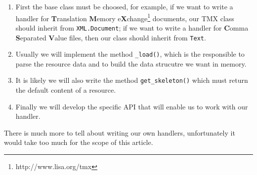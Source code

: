 \begin{enumerate}
  \item First the base class must be choosed, for example, if we want
    to write a handler for {\bf T}ranslation {\bf M}emory
    e{\bf X}change\footnote{http://www.lisa.org/tmx} documents, our TMX
    class should inherit from {\tt XML.Document}; if we want to write
    a handler for {\bf C}omma {\bf S}eparated {\bf V}alue files, then our
    class should inherit from {\tt Text}.

  \item Usually we will implement the method {\tt \_load()}, which is the
    responsible to parse the resource data and to build the data strucutre
    we want in memory.

  \item It is likely we will also write the method {\tt get\_skeleton()}
    which must return the default content of a resource.

  \item Finally we will develop the specific API that will enable us to
    work with our handler.
\end{enumerate}


There is much more to tell about writing our own handlers, unfortunately
it would take too much for the scope of this article.
